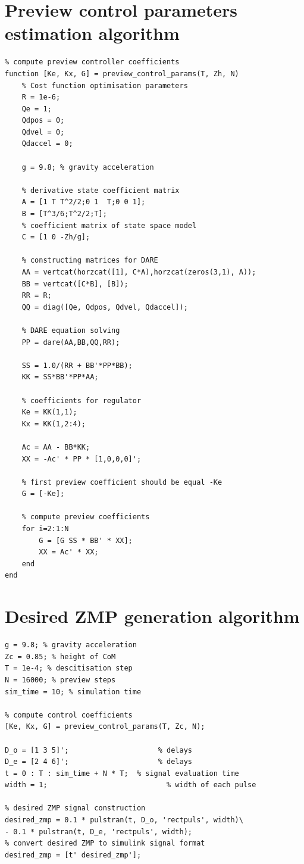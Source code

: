 \documentclass[12pt,a4paper]{report}
\begin{document}
	\begin{appendices}
		\chapter{Preview control parameters estimation algorithm}
			\begin{lstlisting}
% compute preview controller coefficients
function [Ke, Kx, G] = preview_control_params(T, Zh, N)
	% Cost function optimisation parameters
	R = 1e-6; 
	Qe = 1;
	Qdpos = 0;
	Qdvel = 0;
	Qdaccel = 0;
	
	g = 9.8; % gravity acceleration
	
	% derivative state coefficient matrix
	A = [1 T T^2/2;0 1  T;0 0 1];
	B = [T^3/6;T^2/2;T];
	% coefficient matrix of state space model
	C = [1 0 -Zh/g];
	
	% constructing matrices for DARE
	AA = vertcat(horzcat([1], C*A),horzcat(zeros(3,1), A));
	BB = vertcat([C*B], [B]);
	RR = R;
	QQ = diag([Qe, Qdpos, Qdvel, Qdaccel]);
	
	% DARE equation solving
	PP = dare(AA,BB,QQ,RR);
	
	SS = 1.0/(RR + BB'*PP*BB);
	KK = SS*BB'*PP*AA;
	
	% coefficients for regulator
	Ke = KK(1,1);
	Kx = KK(1,2:4);
	
	Ac = AA - BB*KK;
	XX = -Ac' * PP * [1,0,0,0]';
	
	% first preview coefficient should be equal -Ke
	G = [-Ke];
	
	% compute preview coefficients
	for i=2:1:N
		G = [G SS * BB' * XX];
		XX = Ac' * XX;
	end
end
			\end{lstlisting}
		\chapter{Desired ZMP generation algorithm}
			\begin{lstlisting}
g = 9.8; % gravity acceleration
Zc = 0.85; % height of CoM
T = 1e-4; % descitisation step
N = 16000; % preview steps
sim_time = 10; % simulation time

% compute control coefficients
[Ke, Kx, G] = preview_control_params(T, Zc, N);

D_o = [1 3 5]';                     % delays
D_e = [2 4 6]';                     % delays
t = 0 : T : sim_time + N * T;  % signal evaluation time
width = 1;                            % width of each pulse

% desired ZMP signal construction
desired_zmp = 0.1 * pulstran(t, D_o, 'rectpuls', width)\
- 0.1 * pulstran(t, D_e, 'rectpuls', width);
% convert desired ZMP to simulink signal format
desired_zmp = [t' desired_zmp'];
			\end{lstlisting}
	\end{appendices}
  
\end{document}
